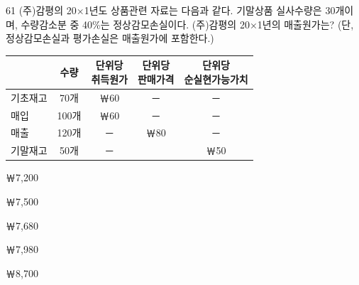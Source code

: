 \begin{question}{61}
(주)감평의 20×1년도 상품관련 자료는 다음과 같다. 기말상품 실사수량은 30개이며, 수량감소분 중 40\%는 정상감모손실이다. (주)감평의 20×1년의 매출원가는? (단, 정상감모손실과 평가손실은 매출원가에 포함한다.)
\par{\small\centering\begin{tabular}{|l|c|c|c|c|}\hline
 & 수량 & \makecell{단위당\\취득원가} & \makecell{단위당\\판매가격} & \makecell{단위당\\순실현가능가치} \\ \hline
기초재고 & 70개 & ￦60 & － & － \\ \hline
매입 & 100개 & ￦60 & － & － \\ \hline
매출 & 120개 & － & ￦80 & － \\ \hline
기말재고 & 50개 & － & & ￦50 \\ \hline
\end{tabular}\par}
\begin{choices}
  \item ￦7,200
  \item ￦7,500
  \item ￦7,680
  \item ￦7,980
  \item ￦8,700
\end{choices}
\end{question}
